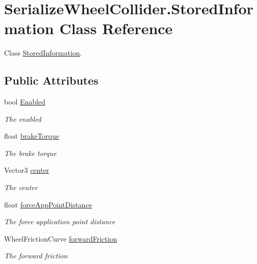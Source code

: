 \hypertarget{class_serialize_wheel_collider_1_1_stored_information}{}\section{Serialize\+Wheel\+Collider.\+Stored\+Information Class Reference}
\label{class_serialize_wheel_collider_1_1_stored_information}


Class \hyperlink{class_serialize_wheel_collider_1_1_stored_information}{Stored\+Information}.  


\subsection*{Public Attributes}
\begin{DoxyCompactItemize}
\item 
bool \hyperlink{class_serialize_wheel_collider_1_1_stored_information_a96fded73b7397ae3a0bb9bdbc3d6bc58}{Enabled}
\begin{DoxyCompactList}\small\item\em The enabled \end{DoxyCompactList}\item 
float \hyperlink{class_serialize_wheel_collider_1_1_stored_information_a936b9be2086f62d60972d0cf09d08f7c}{brake\+Torque}
\begin{DoxyCompactList}\small\item\em The brake torque \end{DoxyCompactList}\item 
Vector3 \hyperlink{class_serialize_wheel_collider_1_1_stored_information_a4d3fd49db44a8f0adac5a07a33dcb911}{center}
\begin{DoxyCompactList}\small\item\em The center \end{DoxyCompactList}\item 
float \hyperlink{class_serialize_wheel_collider_1_1_stored_information_ac2488ad2ea6c9d13564d3437216c6a28}{force\+App\+Point\+Distance}
\begin{DoxyCompactList}\small\item\em The force application point distance \end{DoxyCompactList}\item 
Wheel\+Friction\+Curve \hyperlink{class_serialize_wheel_collider_1_1_stored_information_af02b1607cb9360a6128e058c7a38cab7}{forward\+Friction}
\begin{DoxyCompactList}\small\item\em The forward friction \end{DoxyCompactList}\item 

\end{DoxyCompactItemize}

